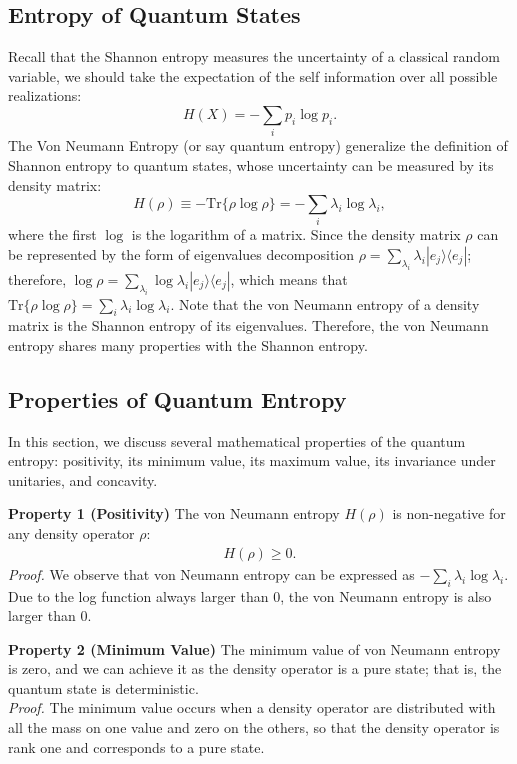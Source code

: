 \subsection{Entropy of Quantum States}
Recall that the Shannon entropy measures the uncertainty of a classical random variable, we should take the expectation of the self information over all possible realizations:
\begin{equation*}
H(X) = -\sum_i p_i \log p_i.
\end{equation*}
The Von Neumann Entropy (or say quantum entropy) generalize the definition of Shannon entropy to quantum states, whose uncertainty can be measured by its density matrix:
\begin{equation*}
H(\rho) \equiv - \text{Tr} \{ \rho \log \rho \} = -\sum_{i} \lambda_i \log \lambda_i,
\end{equation*}
where the first $\log$ is the logarithm of a matrix.
Since the density matrix $\rho$ can be represented by the form of eigenvalues decomposition $\rho = \sum_{\lambda_i} \lambda_i |e_j\rangle \langle e_j|$; therefore, $\log \rho = \sum_{\lambda_i} \log \lambda_i |e_j\rangle \langle e_j|$, which means that $\text{Tr} \{ \rho \log \rho \} = \sum_{i} \lambda_i \log \lambda_i$.
Note that the von Neumann entropy of a density matrix is the Shannon entropy of its eigenvalues. Therefore, the von Neumann entropy shares many properties with the Shannon entropy.

\subsection{Properties of  Quantum Entropy}
In this section, we discuss several mathematical properties of the quantum entropy: positivity, its minimum value, its maximum value, its invariance under unitaries, and concavity.

\textbf{Property 1 (Positivity)} The von Neumann entropy $H(\rho)$ is non-negative for any density operator $\rho$:
\begin{align*}
H(\rho) \geq 0.
\end{align*}
\textit{Proof.} We observe that von Neumann entropy can be expressed as  $-\sum_{i} \lambda_i \log \lambda_i$. Due to the log function always larger than 0, the von Neumann entropy is also larger than 0.

\textbf{Property 2 (Minimum Value)}
The minimum value of von Neumann entropy is zero, and we can achieve it as the density operator is a pure state; that is, the quantum state is deterministic. \\
\textit{Proof.} The minimum value occurs when a density operator are distributed with all the mass on one value and zero on the others, so that the density operator is rank one and corresponds to a pure state.

